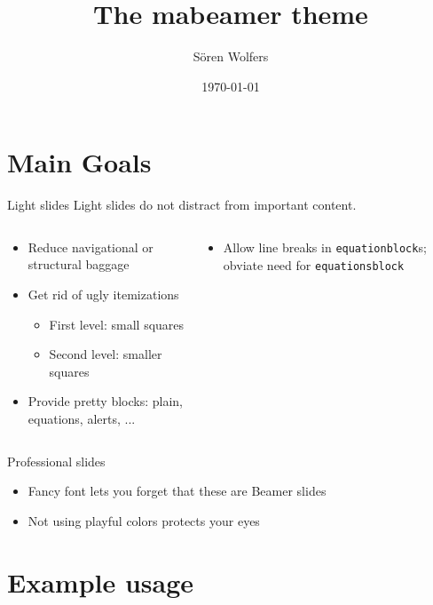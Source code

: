 \documentclass{beamer}
\title{The mabeamer theme}
\date{\today}
\author{Sören Wolfers}
\begin{document}
\matitle*

\section{Main Goals}
\begin{frame}{Light slides}
Light slides do not distract from important content.
\begin{columns}
	\begin{column}{0.5\textwidth}	
		\begin{block}[Done]
		\begin{itemize}
		\item Reduce navigational or structural baggage
		\item Get rid of ugly itemizations	
		\begin{itemize}
		\item First level: small squares
		\item Second level: smaller squares
		\end{itemize}
		\item Provide pretty blocks: plain, equations, alerts, ...
		\end{itemize}
		\end{block}
	\end{column}
	\begin{column}{0.5\textwidth}
		\begin{block}[To Do]
		\begin{itemize}
			\item Allow line breaks in \texttt{equationblock}s; obviate need for \texttt{equationsblock}
		\end{itemize}
		\end{block}
	\end{column}
\end{columns}
\end{frame}

\begin{frame}{Professional slides}
\begin{itemize}
	\item Fancy font lets you forget that these are Beamer slides

	\item Not {\color{purple}using} {\color{orange}playful} {\color{green}colors} {\color{red} protects} {\color{yellow}your} {\color{blue}eyes}
	
\end{itemize}
\end{frame}

\section{Example usage}
\end{document}
